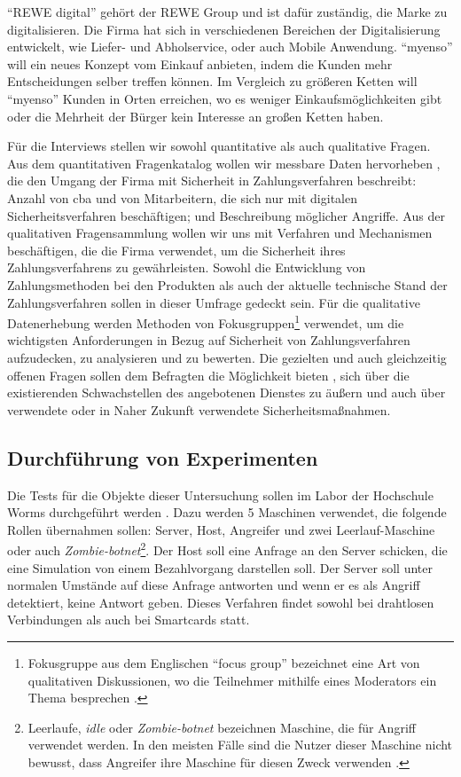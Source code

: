 ``REWE digital'' gehört der REWE Group und ist dafür zuständig, die Marke zu digitalisieren. Die Firma hat sich
in verschiedenen Bereichen der Digitalisierung entwickelt, wie Liefer- und Abholservice, oder auch Mobile Anwendung. 
``myenso'' will ein neues Konzept vom Einkauf anbieten, indem die Kunden mehr Entscheidungen selber treffen können. 
Im Vergleich zu größeren Ketten will ``myenso'' Kunden in Orten erreichen, wo es weniger Einkaufsmöglichkeiten gibt
oder die Mehrheit der Bürger kein Interesse an großen Ketten haben.


Für die Interviews stellen wir sowohl quantitative als auch qualitative Fragen. Aus dem quantitativen Fragenkatalog
wollen wir messbare Daten hervorheben \cite{refbook:SRJR}, die den Umgang der Firma mit Sicherheit in Zahlungsverfahren
beschreibt: Anzahl von \acrfull{cba} und von Mitarbeitern, die sich nur mit digitalen Sicherheitsverfahren beschäftigen;
und Beschreibung möglicher Angriffe. Aus der qualitativen Fragensammlung wollen wir uns mit Verfahren 
und Mechanismen beschäftigen, die die Firma verwendet, um die Sicherheit ihres Zahlungsverfahrens zu gewährleisten. 
Sowohl die Entwicklung von Zahlungsmethoden bei den Produkten als auch der aktuelle technische Stand der Zahlungsverfahren
sollen in dieser Umfrage gedeckt sein. Für die qualitative Datenerhebung werden Methoden von Fokusgruppen\footnote{Fokusgruppe
aus dem Englischen ``focus group'' bezeichnet eine Art von qualitativen Diskussionen, wo die Teilnehmer mithilfe eines 
Moderators ein Thema besprechen \cite{refbook:APGF}.} verwendet, um die wichtigsten Anforderungen in Bezug auf Sicherheit von 
Zahlungsverfahren aufzudecken, zu analysieren und zu bewerten. Die gezielten und auch gleichzeitig offenen Fragen sollen dem
Befragten die Möglichkeit bieten \cite{refbook:EFAF}, sich über die existierenden Schwachstellen des angebotenen
Dienstes zu äußern und auch über verwendete oder in Naher Zukunft verwendete Sicherheitsmaßnahmen.

\subsection{Durchführung von Experimenten}

Die Tests für die Objekte dieser Untersuchung sollen im Labor der Hochschule Worms durchgeführt werden \cite{refbook:FWDL}.
Dazu werden 5 Maschinen verwendet, die folgende Rollen übernahmen sollen: Server, Host, Angreifer und zwei Leerlauf-Maschine oder auch
\textit{Zombie-botnet}\footnote{Leerlaufe, \textit{idle} oder \textit{Zombie-botnet} bezeichnen Maschine, die für Angriff
verwendet werden. In den meisten Fälle sind die Nutzer dieser Maschine nicht bewusst, dass Angreifer ihre Maschine für
diesen Zweck verwenden \cite{refart:XGDD}.}. Der Host soll eine Anfrage an den Server schicken, die eine Simulation
von einem Bezahlvorgang darstellen soll. Der Server soll unter normalen Umstände auf diese Anfrage antworten und wenn er es 
als Angriff detektiert, keine Antwort geben. Dieses Verfahren findet sowohl bei drahtlosen Verbindungen als auch bei Smartcards statt.


